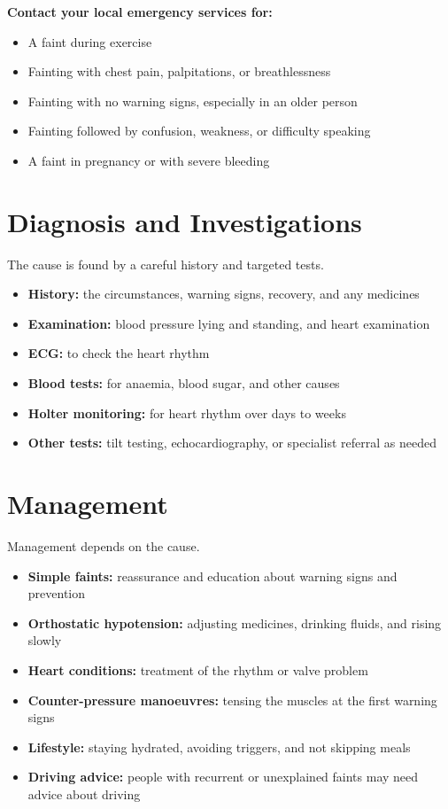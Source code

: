 \textbf{Contact your local emergency services for:}
\begin{itemize}
    \item A faint during exercise
    \item Fainting with chest pain, palpitations, or breathlessness
    \item Fainting with no warning signs, especially in an older person
    \item Fainting followed by confusion, weakness, or difficulty speaking
    \item A faint in pregnancy or with severe bleeding
\end{itemize}

\section*{Diagnosis and Investigations}
The cause is found by a careful history and targeted tests.
\begin{itemize}
    \item \textbf{History:} the circumstances, warning signs, recovery, and any medicines
    \item \textbf{Examination:} blood pressure lying and standing, and heart examination
    \item \textbf{ECG:} to check the heart rhythm
    \item \textbf{Blood tests:} for anaemia, blood sugar, and other causes
    \item \textbf{Holter monitoring:} for heart rhythm over days to weeks
    \item \textbf{Other tests:} tilt testing, echocardiography, or specialist referral as needed
\end{itemize}

\section*{Management}
Management depends on the cause.
\begin{itemize}
    \item \textbf{Simple faints:} reassurance and education about warning signs and prevention
    \item \textbf{Orthostatic hypotension:} adjusting medicines, drinking fluids, and rising slowly
    \item \textbf{Heart conditions:} treatment of the rhythm or valve problem
    \item \textbf{Counter-pressure manoeuvres:} tensing the muscles at the first warning signs
    \item \textbf{Lifestyle:} staying hydrated, avoiding triggers, and not skipping meals
    \item \textbf{Driving advice:} people with recurrent or unexplained faints may need advice about driving
\end{itemize}

